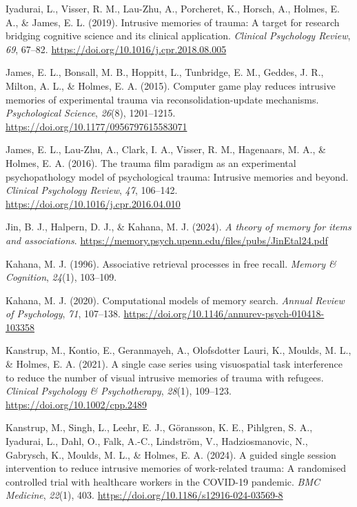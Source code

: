 \documentclass[
  man,
  floatsintext,
  longtable,
  nolmodern,
  notxfonts,
  notimes,
  draftfirst,
  colorlinks=true,linkcolor=blue,citecolor=blue,urlcolor=blue]{apa7}
\newlength{\cslhangindent}
\newenvironment{CSLReferences}[2] %
 {\begin{list}{}{%
  \setlength{\itemindent}{0pt}
  \setlength{\leftmargin}{0pt}
  \setlength{\parsep}{0pt}
  \ifodd #1
   \setlength{\leftmargin}{\cslhangindent}
   \setlength{\itemindent}{-1\cslhangindent}
  \fi
  \setlength{\itemsep}{#2\baselineskip}}}
 {\end{list}}
\begin{document}
\begin{CSLReferences}{1}{0}
Iyadurai, L., Visser, R. M., Lau-Zhu, A., Porcheret, K., Horsch, A.,
Holmes, E. A., \& James, E. L. (2019). Intrusive memories of trauma: A
target for research bridging cognitive science and its clinical
application. \emph{Clinical Psychology Review}, \emph{69}, 67--82.
\url{https://doi.org/10.1016/j.cpr.2018.08.005}

James, E. L., Bonsall, M. B., Hoppitt, L., Tunbridge, E. M., Geddes, J.
R., Milton, A. L., \& Holmes, E. A. (2015). Computer game play reduces
intrusive memories of experimental trauma via reconsolidation-update
mechanisms. \emph{Psychological Science}, \emph{26}(8), 1201--1215.
\url{https://doi.org/10.1177/0956797615583071}

James, E. L., Lau-Zhu, A., Clark, I. A., Visser, R. M., Hagenaars, M.
A., \& Holmes, E. A. (2016). The trauma film paradigm as an experimental
psychopathology model of psychological trauma: Intrusive memories and
beyond. \emph{Clinical Psychology Review}, \emph{47}, 106--142.
\url{https://doi.org/10.1016/j.cpr.2016.04.010}

Jin, B. J., Halpern, D. J., \& Kahana, M. J. (2024). \emph{A theory of
memory for items and associations}.
\url{https://memory.psych.upenn.edu/files/pubs/JinEtal24.pdf}

Kahana, M. J. (1996). Associative retrieval processes in free recall.
\emph{Memory \& Cognition}, \emph{24}(1), 103--109.

Kahana, M. J. (2020). Computational models of memory search.
\emph{Annual Review of Psychology}, \emph{71}, 107--138.
\url{https://doi.org/10.1146/annurev-psych-010418-103358}

Kanstrup, M., Kontio, E., Geranmayeh, A., Olofsdotter Lauri, K., Moulds,
M. L., \& Holmes, E. A. (2021). A single case series using visuospatial
task interference to reduce the number of visual intrusive memories of
trauma with refugees. \emph{Clinical Psychology \& Psychotherapy},
\emph{28}(1), 109--123. \url{https://doi.org/10.1002/cpp.2489}

Kanstrup, M., Singh, L., Leehr, E. J., Göransson, K. E., Pihlgren, S.
A., Iyadurai, L., Dahl, O., Falk, A.-C., Lindström, V., Hadziosmanovic,
N., Gabrysch, K., Moulds, M. L., \& Holmes, E. A. (2024). A guided
single session intervention to reduce intrusive memories of work-related
trauma: A randomised controlled trial with healthcare workers in the
{COVID-19} pandemic. \emph{BMC Medicine}, \emph{22}(1), 403.
\url{https://doi.org/10.1186/s12916-024-03569-8}


\end{CSLReferences}
\end{document}
